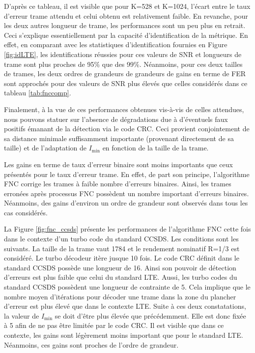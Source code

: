 D'après ce tableau, il est visible que pour K=528 et K=1024, l'écart entre le taux d'erreur trame attendu et celui obtenu 
est relativement faible. En revanche, pour les deux autres longueur de trame, les performances sont un peu plus en retrait.
Ceci s'explique essentiellement par la capacité d'identification de la métrique. En effet, en comparant avec les statistiques d'identification fournies en Figure \ref{fig:idLTE}, les identifications réussies pour ces valeurs de SNR et longueurs de trame sont plus proches de 95\%
que des 99\%. Néanmoins, pour ces deux tailles de trames, les deux ordres de grandeurs de grandeurs de gains en terme de FER sont
approchés pour des valeurs de SNR plus élevés que celles considérés dans ce tableau \ref{tab:fnccomp}.

Finalement, à la vue de ces performances obtenues vis-à-vis de celles attendues, nous pouvons statuer sur l'absence de 
dégradations due à d'éventuels faux positifs émanant de la détection via le code CRC. Ceci provient conjointement de sa
distance minimale suffisamment importante (provenant directement de sa taille) et de l'adaptation de $I_{\text{min}}$ en 
fonction de la taille de la trame.

Les gains en terme de taux d'erreur binaire sont moins importants que ceux présentés pour le taux d'erreur trame. En effet,
de part son principe, l'algorithme FNC corrige les trames à faible nombre d'erreurs binaires. Ainsi, les trames erronées 
après processus FNC possèdent un nombre important d'erreurs binaires. Néanmoins, des gains d'environ un ordre de grandeur 
sont observés dans tous les cas considérés. 

La Figure \ref{fig:fnc_ccsds} présente les performances de l'algorithme FNC cette fois dans le contexte d'un turbo code 
du standard CCSDS. Les conditions sont les suivants. La taille de la trame vaut 1784 et le rendement nominatif R=1/3 est 
considéré. Le turbo décodeur itère jusque 10 fois. Le code CRC définit dans le standard CCSDS possède une longueur de 16.
Ainsi son pouvoir de détection d'erreurs est plus faible que celui du standard LTE. Aussi, les turbo codes du 
standard CCSDS possèdent une longueur de contrainte de 5. Cela implique que le nombre moyen d'itérations pour décoder une trame dans 
la zone du plancher d'erreur est plus élevé que dans le contexte LTE. Suite à ces deux constatations, la valeur de 
$I_\text{min}$ se doit d'être plus élevée que précédemment. Elle est donc fixée à 5 afin de ne pas être limitée par le code CRC. 
Il est visible que dans ce contexte, les gains sont légèrement moins important que pour le standard LTE. Néanmoins, ces gains
sont proches de l'ordre de grandeur.

